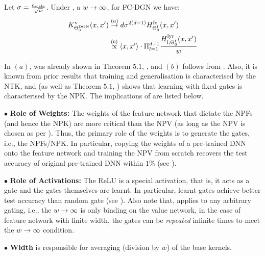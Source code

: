 \begin{theorem}\label{th:main} Let $\sigma=\frac{c_{\text{scale}}}{\sqrt{w}}$. Under , a $w\rightarrow\infty$, for FC-DGN we have: 
\begin{align*}
K^{\text{v}}_{\Theta^{\text{DGN}}_0}(x,x')&\stackrel{(a)}{\rightarrow} d \sigma^{2(d-1)} H^{\text{fc}}_{\Theta^{\textrm{f}}_0}(x,x')\\ 
&\stackrel{(b)}\propto \langle x,x'\rangle\cdot \Pi_{l=1}^{d-1} \frac{H^{\text{lyr}}_{l,\Theta^{\textrm{f}}_0}(x,x')}{w}
\end{align*}
\end{theorem}
In  $(a)$, was already shown in {Theorem $5.1$}, \cite{npk}, and $(b)$ follows from . Also, it is known from prior results \cite{arora2019exact,cao2019generalization} that training and generalisation is characterised by the NTK, and  (as well as {Theorem $5.1$}, \cite{npk}) shows that learning with fixed gates is characterised by the NPK. The implications of  are listed below.

$\bullet$ \textbf{Role of Weights:}  The weights of the feature network that dictate the NPFs (and hence the NPK) are more critical than the NPV (as long as the NPV is chosen as per ). Thus, the primary role of the weights is to generate the gates, i.e., the NPFs/NPK. In particular, copying the weights of a pre-trained DNN onto the feature network and training the NPV from scratch recovers the test accuracy of original pre-trained DNN within $1\%$ (see ). 

$\bullet$ \textbf{Role of Activations:} The ReLU is a special activation, that is, it acts as a gate and the gates themselves are learnt. In particular, learnt gates achieve better test accuracy than random gate (see ). Also note that,  applies to any arbitrary gating, i.e., the $w\rightarrow\infty$ is only binding on the value network, in the case of feature network with finite width, the gates can be \emph{repeated} infinite times to meet the $w\rightarrow\infty$ condition. 

$\bullet$ \textbf{Width} is responsible for averaging (division by $w$) of the base kernels.

